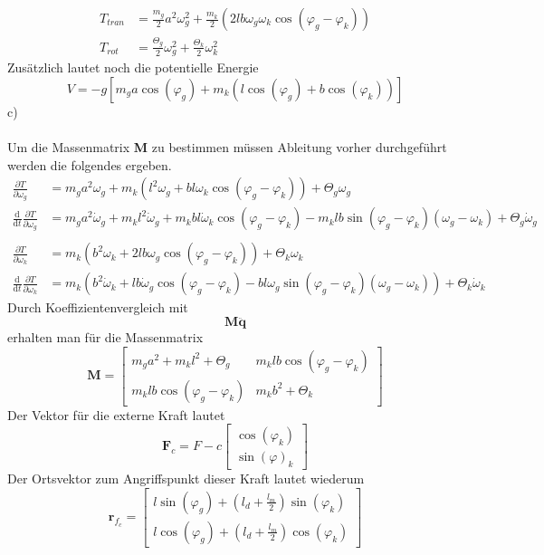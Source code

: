 \begin{align*}
	T_{tran} &= \frac{m_g}{2}a^2\omega^2_g + \frac{m_k}{2}\left(2lb\omega_g\omega_k\cos(\varphi_g - \varphi_k)\right) \\
	T_{rot} &= \frac{\varTheta_g}{2}\omega^2_g + \frac{\varTheta_k}{2}\omega^2_k
\end{align*}
Zusätzlich lautet noch die potentielle Energie
\[
	V = -g\left[m_ga\cos(\varphi_g) + m_k(l\cos(\varphi_g) + b\cos(\varphi_k))\right]
\]
\newpage
\noindent
c)\\ \\
Um die Massenmatrix \textbf{M} zu bestimmen müssen Ableitung vorher durchgeführt werden die folgendes ergeben.
\begin{align*}
	\frac{\partial T}{\partial \omega_g} &= m_g a^2\omega_g + m_k\left(l^2\omega_g + bl\omega_k\cos(\varphi_g - \varphi_k)\right) + \varTheta_g\omega_g \\
	\frac{\text{d}}{\text{d}t}\frac{\partial T}{\partial \omega_g} &= m_ga^2\dot{\omega}_g + m_kl^2\dot{\omega}_g + m_kbl\dot{\omega}_k\cos(\varphi_g - \varphi_k) - m_klb\sin(\varphi_g - \varphi_k)(\omega_g - \omega_k) + \varTheta_g\dot{\omega}_g \\ \\
	\frac{\partial T}{\partial \omega_k} &= m_k\left(b^2\omega_k + 2lb\omega_g\cos(\varphi_g - \varphi_k)\right) + \varTheta_k\omega_k \\
	\frac{\text{d}}{\text{d}t}\frac{\partial T}{\partial \omega_k} &= m_k\left(b^2\dot{\omega}_k + lb\dot{\omega}_g\cos(\varphi_g - \varphi_k) - bl\omega_g\sin(\varphi_g - \varphi_k)(\omega_g - \omega_k)\right) + \varTheta_k\dot{\omega}_k
\end{align*}
Durch Koeffizientenvergleich mit 
\[
	\textbf{M}\ddot{\textbf{q}} 
\]
erhalten man für die Massenmatrix
\[
	\textbf{M} = \begin{bmatrix}
		m_ga^2 + m_kl^2 + \varTheta_g & m_klb\cos(\varphi_g - \varphi_k) \\
		m_klb\cos(\varphi_g - \varphi_k) & m_kb^2 + \varTheta_k
	\end{bmatrix}
\]
Der Vektor für die externe Kraft lautet
\[
	\textbf{F}_c = F-c\begin{bmatrix}
		\cos(\varphi_k) \\
		\sin(\varphi)_k
	\end{bmatrix}
\]
Der Ortsvektor zum Angriffspunkt dieser Kraft lautet wiederum
\[
	\textbf{r}_{f_c} = \begin{bmatrix}
		l\sin(\varphi_g) + \left(l_d + \frac{l_m}{2}\right)\sin(\varphi_k) \\
		l\cos(\varphi_g) + \left(l_d + \frac{l_m}{2}\right)\cos(\varphi_k)
	\end{bmatrix}
\]
